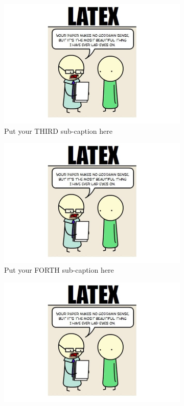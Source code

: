 \documentclass[a4paper]{article}
\begin{document}
\begin{figure}[ht]
\begin{subfigure}{.3\textwidth}
  \includegraphics[width=1\linewidth]{./fig-latex.jpg}  
  \caption{Put your THIRD sub-caption here}
  \label{fig:sub-second}
\end{subfigure}
\begin{subfigure}{.3\textwidth}
  \centering
  \includegraphics[width=1\linewidth]{./fig-latex.jpg}  
  \caption{Put your FORTH sub-caption here}
  \label{fig:sub-second}
\end{subfigure}
\begin{subfigure}{.3\textwidth}
  \centering
  \includegraphics[width=1\linewidth]{./fig-latex.jpg}  

\end{subfigure}
\end{figure}
\end{document}
